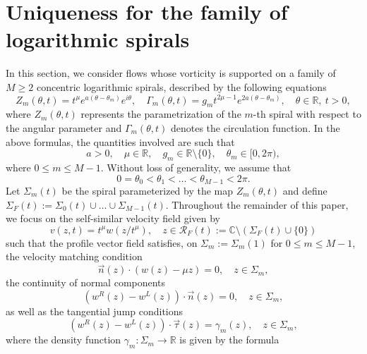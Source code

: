 \documentclass[11pt, letterpaper, reqno]{amsart}
\numberwithin{equation}{section}
\theoremstyle{definition}
\theoremstyle{plain}
\numberwithin{equation}{section}
\def\R{\mathbb{R}}
\def\C{\mathbb{C}}
\def\RR{\mathcal{R}}
\begin{document}
\section{Uniqueness for the family of logarithmic spirals}\label{wiele_spiral}
In this section, we consider flows whose vorticity is supported on a family of $M\ge 2$ concentric logarithmic spirals, described by the following equations
\begin{equation*}
Z_m(\theta , t) = t^\mu e^{a (\theta - \theta_m )} e^{i\theta }, \quad 
\Gamma_m (\theta ,t) = g_m t^{2\mu -1}  e^{2a (\theta - \theta_m )}, \quad \theta \in \R, \ t>0,
\end{equation*}
where $Z_m(\theta , t)$ represents the parametrization of the $m$-th spiral with respect to the angular parameter and $\Gamma_m (\theta , t)$ denotes the circulation function. In the above formulas, the quantities involved are such that
\begin{equation}\label{log_spirals_parameters}
a>0, \quad \mu \in \R , \quad g_m \in \R\setminus\{0\}, \quad \theta_m \in [0,2\pi ),
\end{equation}
where $0\le m \le M-1$. Without loss of generality, we assume that
\[
0 = \theta_0 < \theta_1 < \ldots < \theta_{M-1} < 2\pi. 
\]
Let $\Sigma_{m}(t)$ be the spiral parameterized by the map $Z_{m}(\theta,t)$ and define $\Sigma_{F}(t) := \Sigma_{0}(t)\cup\ldots\cup\Sigma_{M-1}(t)$. Throughout the remainder of this paper, we focus on the self-similar velocity field given by 
\begin{equation*}
v(z,t)=t^\mu w(z/t^\mu), \quad z\in \RR_{F}(t) := \C\setminus(\Sigma_{F}(t)\cup\{0\})
\end{equation*}
such that the profile vector field satisfies, on $\Sigma_{m} := \Sigma_{m}(1)$ for $0\le m \le M-1$, the velocity matching condition 
\begin{equation}\label{vel_match-m}
\vec{n}(z)\cdot\left(w(z)-\mu z\right)=0, \quad z\in \Sigma_{m},
\end{equation}
the continuity of normal components  
\begin{equation}\label{skoki-nor-m}
(w^R(z)-w^L(z))\cdot \vec{n}(z) = 0, \quad  z\in \Sigma_{m}, 
\end{equation}
as well as the tangential jump conditions
\begin{equation}\label{skoki-tan-m}
(w^R(z)-w^L(z))\cdot\vec{\tau}(z) = \gamma_{m}(z), \quad z\in \Sigma_{m}, 
\end{equation}
where the density function $\gamma_{m}:\Sigma_{m}\to\R$ is given by the formula 
\end{document}
